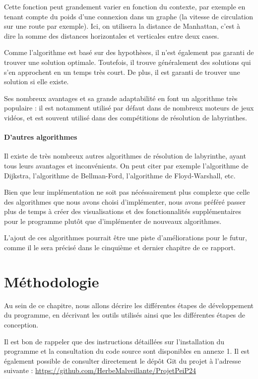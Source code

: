 \documentclass[12pt]{scrreprt} %
\begin{document}
Cette fonction peut grandement varier en fonction du contexte, par exemple en tenant compte du poids d'une connexion dans un graphe (la vitesse de circulation sur une route par exemple). Ici, on utilisera la distance de Manhattan, c'est à dire la somme des distances horizontales et verticales entre deux cases.

Comme l'algorithme est basé sur des hypothèses, il n'est également pas garanti de trouver une solution optimale. Toutefois, il trouve généralement des solutions qui s'en approchent en un temps très court. De plus, il est garanti de trouver une solution si elle existe.

Ses nombreux avantages et sa grande adaptabilité en font un algorithme très populaire : il est notamment utilisé par défaut dans de nombreux moteurs de jeux vidéos, et est souvent utilisé dans des compétitions de résolution de labyrinthes.

\subsubsection{D'autres algorithmes}

Il existe de très nombreux autres algorithmes de résolution de labyrinthe, ayant tous leurs avantages et inconvénients. On peut citer par exemple l'algorithme de Dijkstra, l'algorithme de Bellman-Ford, l'algorithme de Floyd-Warshall, etc.

Bien que leur implémentation ne soit pas nécéssairement plus complexe que celle des algorithmes que nous avons choisi d'implémenter, nous avons préféré passer plus de temps à créer des visualisations et des fonctionnalités supplémentaires pour le programme plutôt que d'implémenter de nouveaux algorithmes.

L'ajout de ces algorithmes pourrait être une piste d'améliorations pour le futur, comme il le sera précisé dans le cinquième et dernier chapitre de ce rapport.

\chapter{Méthodologie}


Au sein de ce chapitre, nous allons décrire les différentes étapes de développement du programme, en décrivant les outils utilisés ainsi que les différentes étapes de conception.

Il est bon de rappeler que des instructions détaillées sur l'installation du programme et la consultation du code source sont disponibles en annexe 1. Il est également possible de consulter directement le dépôt Git du projet à l'adresse suivante : \url{https://github.com/HerbeMalveillante/ProjetPeiP24}
\end{document}
